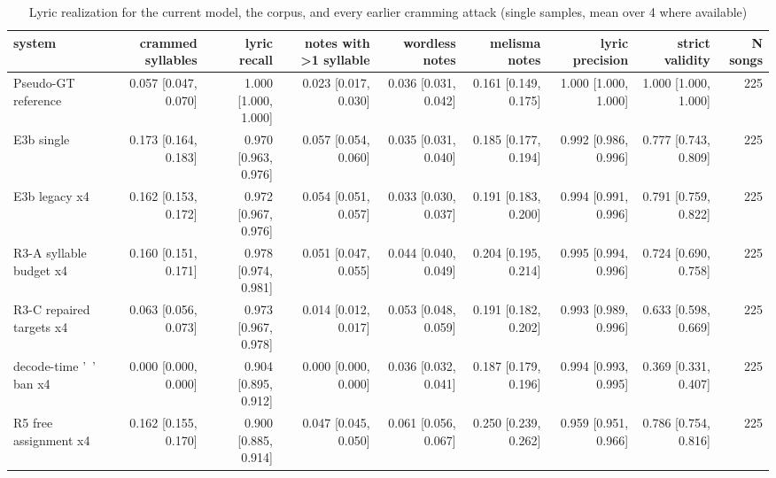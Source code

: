 \begin{table}[t]
\centering
\small
\begin{tabular}{lrrrrrrrr}
\toprule
system & crammed syllables & lyric recall & notes with >1 syllable & wordless notes & melisma notes & lyric precision & strict validity & N songs \\
\midrule
Pseudo-GT reference & 0.057 [0.047, 0.070] & 1.000 [1.000, 1.000] & 0.023 [0.017, 0.030] & 0.036 [0.031, 0.042] & 0.161 [0.149, 0.175] & 1.000 [1.000, 1.000] & 1.000 [1.000, 1.000] & 225 \\
E3b single & 0.173 [0.164, 0.183] & 0.970 [0.963, 0.976] & 0.057 [0.054, 0.060] & 0.035 [0.031, 0.040] & 0.185 [0.177, 0.194] & 0.992 [0.986, 0.996] & 0.777 [0.743, 0.809] & 225 \\
E3b legacy x4 & 0.162 [0.153, 0.172] & 0.972 [0.967, 0.976] & 0.054 [0.051, 0.057] & 0.033 [0.030, 0.037] & 0.191 [0.183, 0.200] & 0.994 [0.991, 0.996] & 0.791 [0.759, 0.822] & 225 \\
R3-A syllable budget x4 & 0.160 [0.151, 0.171] & 0.978 [0.974, 0.981] & 0.051 [0.047, 0.055] & 0.044 [0.040, 0.049] & 0.204 [0.195, 0.214] & 0.995 [0.994, 0.996] & 0.724 [0.690, 0.758] & 225 \\
R3-C repaired targets x4 & 0.063 [0.056, 0.073] & 0.973 [0.967, 0.978] & 0.014 [0.012, 0.017] & 0.053 [0.048, 0.059] & 0.191 [0.182, 0.202] & 0.993 [0.989, 0.996] & 0.633 [0.598, 0.669] & 225 \\
decode-time '~' ban x4 & 0.000 [0.000, 0.000] & 0.904 [0.895, 0.912] & 0.000 [0.000, 0.000] & 0.036 [0.032, 0.041] & 0.187 [0.179, 0.196] & 0.994 [0.993, 0.995] & 0.369 [0.331, 0.407] & 225 \\
R5 free assignment x4 & 0.162 [0.155, 0.170] & 0.900 [0.885, 0.914] & 0.047 [0.045, 0.050] & 0.061 [0.056, 0.067] & 0.250 [0.239, 0.262] & 0.959 [0.951, 0.966] & 0.786 [0.754, 0.816] & 225 \\
\bottomrule
\end{tabular}
\caption{Lyric realization for the current model, the corpus, and every earlier cramming attack (single samples, mean over 4 where available)}
\label{tab:lyric_failures}
\end{table}

